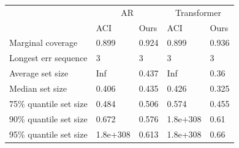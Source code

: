 \begin{tabular}{lllll}
\toprule
& \multicolumn{2}{c}{AR}& \multicolumn{2}{c}{Transformer} \\
& ACI & Ours & ACI & Ours \\
\midrule
Marginal coverage & 0.899 & 0.924 & 0.899 & 0.936 \\
Longest err sequence & 3 & 3 & 3 & 3 \\
Average set size & Inf & 0.437 & Inf & 0.36 \\
Median set size & 0.406 & 0.435 & 0.426 & 0.325 \\
75\% quantile set size & 0.484 & 0.506 & 0.574 & 0.455 \\
90\% quantile set size & 0.672 & 0.576 & 1.8e+308 & 0.61 \\
95\% quantile set size & 1.8e+308 & 0.613 & 1.8e+308 & 0.66 \\
\bottomrule
\end{tabular}

